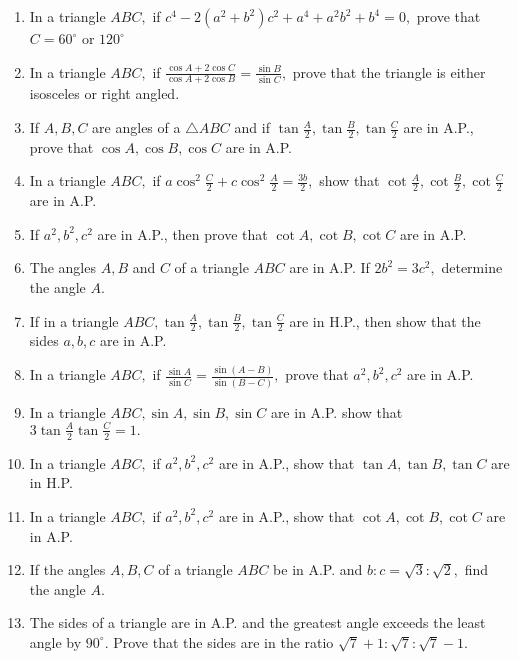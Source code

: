 \begin{enumerate}
\item In a triangle $ABC,$ if $c^4 - 2(a^2 + b^2)c^2 + a^4 + a^2b^2 + b^4 = 0,$ prove that $C=60^\circ$ or
    $120^\circ$

\item In a triangle $ABC,$ if $\frac{\cos A + 2\cos C}{\cos A + 2\cos B} = \frac{\sin B}{\sin C},$ prove that the
    triangle is either isosceles or right angled.

\item If $A, B, C$ are angles of a $\triangle ABC$ and if $\tan\frac{A}{2}, \tan\frac{B}{2}, \tan\frac{C}{2}$ are
    in A.P., prove that $\cos A, \cos B, \cos C$ are in A.P.

\item In a triangle $ABC,$ if $a\cos^2\frac{C}{2} + c\cos^2\frac{A}{2} = \frac{3b}{2},$ show that $\cot\frac{A}{2},
    \cot\frac{B}{2}, \cot\frac{C}{2}$ are in A.P.

\item If $a^2, b^2, c^2$ are in A.P., then prove that $\cot A, \cot B, \cot C$ are in A.P.

\item The angles $A, B$ and $C$ of a triangle $ABC$ are in A.P. If $2b^2 = 3c^2,$ determine the angle $A.$

\item If in a triangle $ABC, \tan\frac{A}{2}, \tan\frac{B}{2}, \tan\frac{C}{2}$ are in H.P., then show that the sides $a,
    b, c$ are in A.P.

\item In a triangle $ABC,$ if $\frac{\sin A}{\sin C} = \frac{\sin(A - B)}{\sin(B - C)},$ prove that $a^2, b^2, c^2$
    are in A.P.

\item In a triangle $ABC, \sin A, \sin B, \sin C$ are in A.P. show that $3\tan\frac{A}{2}\tan\frac{C}{2} = 1.$

\item In a triangle $ABC,$ if $a^2, b^2, c^2$ are in A.P., show that $\tan A, \tan B, \tan C$ are in H.P.

\item In a triangle $ABC,$ if $a^2, b^2, c^2$ are in A.P., show that $\cot A, \cot B, \cot C$ are in A.P.

\item If the angles $A, B, C$ of a triangle $ABC$ be in A.P. and $b:c = \sqrt{3}:\sqrt{2},$ find the angle
    $A.$

\item The sides of a triangle are in A.P. and the greatest angle exceeds the least angle by $90^\circ.$ Prove that the sides
    are in the ratio $\sqrt{7} + 1: \sqrt{7}: \sqrt{7} - 1.$


\end{enumerate}

